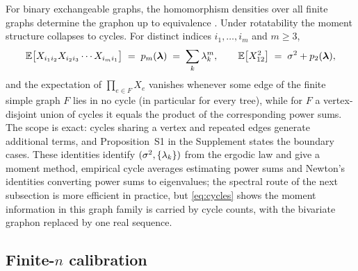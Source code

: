 For binary exchangeable graphs, the homomorphism densities over all
finite graphs determine the graphon up to equivalence
\citep{lovasz2012large}. Under rotatability the moment structure
collapses to cycles. For distinct indices $i_1,\dots,i_m$ and $m\ge3$,
\begin{equation}
\label{eq:cycles}
\mathbb{E}\bigl[X_{i_1i_2}X_{i_2i_3}\cdots X_{i_mi_1}\bigr] \;=\; p_m(\bm{\lambda})
\;=\;\sum_k \lambda_k^m ,
\qquad
\mathbb{E}\bigl[X_{12}^2\bigr] \;=\; \sigma^2 + p_2(\bm{\lambda}),
\end{equation}
and the expectation of $\prod_{e\in F}X_e$ vanishes whenever some edge
of the finite simple graph $F$ lies in no cycle (in particular for every
tree), while for $F$ a vertex-disjoint union of cycles it equals the
product of the corresponding power sums. The scope is exact: cycles
sharing a vertex and repeated edges generate additional terms, and
Proposition~S1 in the Supplement states the boundary cases. These
identities identify $(\sigma^2,\{\lambda_k\})$ from the ergodic law and
give a moment method, empirical cycle averages estimating power sums and
Newton's identities converting power sums to eigenvalues; the spectral
route of the next subsection is more efficient in practice, but
\eqref{eq:cycles} shows the moment information in this graph family is
carried by cycle counts, with the bivariate graphon replaced by one real
sequence.

\subsection{Finite-$n$ calibration}
\label{sec:bbp}

